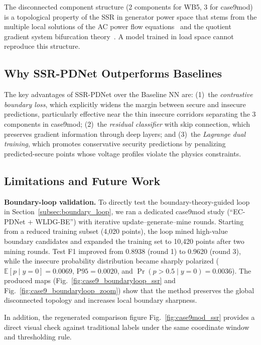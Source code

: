 \documentclass[journal]{IEEEtran}
\begin{document}
The disconnected component structure (2 components for WB5, 3 for case9mod)
is a topological property of the SSR in generator power space that stems from
the multiple local solutions of the AC power flow equations~\cite{bukhsh2013local}
and the quotient gradient system bifurcation theory~\cite{jiang2017feasibility}.
A model trained in load space cannot reproduce this structure.

\subsection{Why SSR-PDNet Outperforms Baselines}

The key advantages of SSR-PDNet over the Baseline NN are:
(1)~the \emph{contrastive boundary loss}, which explicitly widens the margin
between secure and insecure predictions, particularly effective near the
thin insecure corridors separating the 3 components in case9mod;
(2)~the \emph{residual classifier} with skip connection, which preserves
gradient information through deep layers; and
(3)~the \emph{Lagrange dual training}, which promotes conservative security
predictions by penalizing predicted-secure points whose voltage profiles
violate the physics constraints.

\subsection{Limitations and Future Work}

\textbf{Boundary-loop validation.}
To directly test the boundary-theory-guided loop in
Section~\ref{subsec:boundary_loop}, we ran a dedicated case9mod study
(``EC-PDNet + WLDG-BE'') with iterative update--generate--mine rounds.
Starting from a reduced training subset (4,020 points), the loop mined
high-value boundary candidates and expanded the training set to 10,420 points
after two mining rounds. Test F1 improved from 0.8938 (round 1) to 0.9620
(round 3), while the insecure probability distribution became sharply polarized
($\mathbb{E}[p\mid y=0]=0.0069$, $\mathrm{P95}=0.0020$, and
$\Pr(p>0.5\mid y=0)=0.0036$). The produced maps (Fig.~\ref{fig:case9_boundaryloop_ssr}
and Fig.~\ref{fig:case9_boundaryloop_zoom}) show that the method preserves the
global disconnected topology and increases local boundary sharpness.

In addition, the regenerated comparison figure Fig.~\ref{fig:case9mod_ssr}
provides a direct visual check against traditional labels under the same
coordinate window and thresholding rule.
\end{document}
